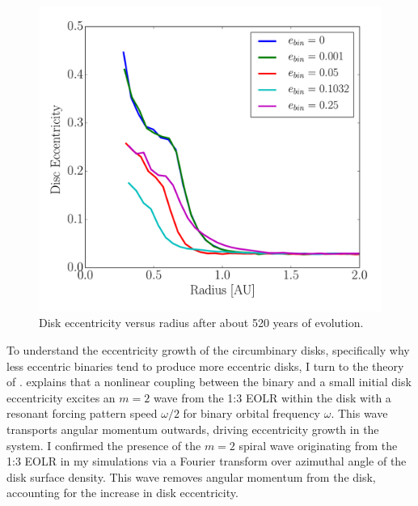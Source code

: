 \begin{figure}
	\includegraphics[width=\columnwidth]{f3}
    \caption{Disk eccentricity versus radius after about 520 years of evolution.}
    \label{fig:CBDiskDiskEccRad}
\end{figure}

To understand the eccentricity growth of the circumbinary disks,
specifically why less eccentric binaries tend to produce more
eccentric disks, I turn to the theory of \citet{Papaloizou2001}.
\citet{Papaloizou2001} explains that a nonlinear coupling between the
binary and a small initial disk eccentricity excites an $m = 2$ wave
from the 1:3 EOLR within the disk with a resonant forcing pattern
speed $\omega/2$ for binary orbital frequency $\omega$.  This wave
transports angular momentum outwards, driving eccentricity growth in
the system.  I confirmed the presence of the $m = 2$ spiral wave
originating from the 1:3 EOLR in my simulations via a Fourier transform over azimuthal
angle of the disk surface density.  This wave removes angular momentum from the disk, accounting for the increase in disk eccentricity.  

